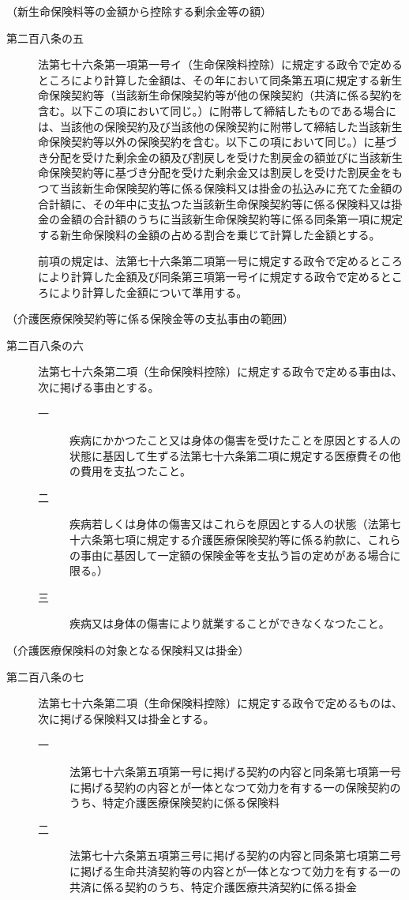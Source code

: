 \documentclass[twocolumn,a4j,10pt]{ltjtarticle}
\begin{document}
\noindent\hspace{10pt}（新生命保険料等の金額から控除する剰余金等の額）
\begin{description}
\item[第二百八条の五]法第七十六条第一項第一号イ（生命保険料控除）に規定する政令で定めるところにより計算した金額は、その年において同条第五項に規定する新生命保険契約等（当該新生命保険契約等が他の保険契約（共済に係る契約を含む。以下この項において同じ。）に附帯して締結したものである場合には、当該他の保険契約及び当該他の保険契約に附帯して締結した当該新生命保険契約等以外の保険契約を含む。以下この項において同じ。）に基づき分配を受けた剰余金の額及び割戻しを受けた割戻金の額並びに当該新生命保険契約等に基づき分配を受けた剰余金又は割戻しを受けた割戻金をもつて当該新生命保険契約等に係る保険料又は掛金の払込みに充てた金額の合計額に、その年中に支払つた当該新生命保険契約等に係る保険料又は掛金の金額の合計額のうちに当該新生命保険契約等に係る同条第一項に規定する新生命保険料の金額の占める割合を乗じて計算した金額とする。
\item[]前項の規定は、法第七十六条第二項第一号に規定する政令で定めるところにより計算した金額及び同条第三項第一号イに規定する政令で定めるところにより計算した金額について準用する。
\end{description}
\noindent\hspace{10pt}（介護医療保険契約等に係る保険金等の支払事由の範囲）
\begin{description}
\item[第二百八条の六]法第七十六条第二項（生命保険料控除）に規定する政令で定める事由は、次に掲げる事由とする。
\begin{description}
\item[一]疾病にかかつたこと又は身体の傷害を受けたことを原因とする人の状態に基因して生ずる法第七十六条第二項に規定する医療費その他の費用を支払つたこと。
\item[二]疾病若しくは身体の傷害又はこれらを原因とする人の状態（法第七十六条第七項に規定する介護医療保険契約等に係る約款に、これらの事由に基因して一定額の保険金等を支払う旨の定めがある場合に限る。）
\item[三]疾病又は身体の傷害により就業することができなくなつたこと。
\end{description}
\end{description}
\noindent\hspace{10pt}（介護医療保険料の対象となる保険料又は掛金）
\begin{description}
\item[第二百八条の七]法第七十六条第二項（生命保険料控除）に規定する政令で定めるものは、次に掲げる保険料又は掛金とする。
\begin{description}
\item[一]法第七十六条第五項第一号に掲げる契約の内容と同条第七項第一号に掲げる契約の内容とが一体となつて効力を有する一の保険契約のうち、特定介護医療保険契約に係る保険料
\item[二]法第七十六条第五項第三号に掲げる契約の内容と同条第七項第二号に掲げる生命共済契約等の内容とが一体となつて効力を有する一の共済に係る契約のうち、特定介護医療共済契約に係る掛金
\end{description}
\end{description}
\end{document}
